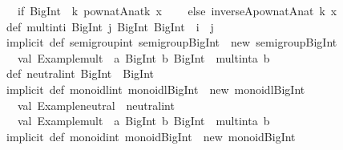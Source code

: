 \begin{isabellebody}
\begin{isamarkuptext}
\begin{typewriter}
\ \ {\isacharparenleft}if\ {\isacharparenleft}BigInt{\isacharparenleft}{}{\isacharparenright}\ {\isacharless}{\isacharequal}\ k{\isacharparenright}\ pow{\isacharunderscore}nat{\isacharbrackleft}A{\isacharbrackright}{\isacharparenleft}nat{\isacharparenleft}k{\isacharparenright}{\isacharcomma}\ x{\isacharparenright}\isanewline
\ \ \ \ else\ inverse{\isacharbrackleft}A{\isacharbrackright}{\isacharparenleft}pow{\isacharunderscore}nat{\isacharbrackleft}A{\isacharbrackright}{\isacharparenleft}nat{\isacharparenleft}{\isacharparenleft}{\isacharminus}\ k{\isacharparenright}{\isacharparenright}{\isacharcomma}\ x{\isacharparenright}{\isacharparenright}{\isacharparenright}\isanewline
\isanewline
def\ mult{\isacharunderscore}int{\isacharparenleft}i{\isacharcolon}\ BigInt{\isacharcomma}\ j{\isacharcolon}\ BigInt{\isacharparenright}{\isacharcolon}\ BigInt\ {\isacharequal}\ i\ {\isacharplus}\ j\isanewline
\isanewline
implicit\ def\ semigroup{\isacharunderscore}int{\isacharcolon}\ semigroup{\isacharbrackleft}BigInt{\isacharbrackright}\ {\isacharequal}\ new\ semigroup{\isacharbrackleft}BigInt{\isacharbrackright}\ {\isacharbraceleft}\isanewline
\ \ val\ {\isacharbackquote}Example{\isachardot}mult{\isacharbackquote}\ {\isacharequal}\ {\isacharparenleft}a{\isacharcolon}\ BigInt{\isacharcomma}\ b{\isacharcolon}\ BigInt{\isacharparenright}\ {\isacharequal}{\isachargreater}\ mult{\isacharunderscore}int{\isacharparenleft}a{\isacharcomma}\ b{\isacharparenright}\isanewline
{\isacharbraceright}\isanewline
\isanewline
def\ neutral{\isacharunderscore}int{\isacharcolon}\ BigInt\ {\isacharequal}\ BigInt{\isacharparenleft}{}{\isacharparenright}\isanewline
\isanewline
implicit\ def\ monoidl{\isacharunderscore}int{\isacharcolon}\ monoidl{\isacharbrackleft}BigInt{\isacharbrackright}\ {\isacharequal}\ new\ monoidl{\isacharbrackleft}BigInt{\isacharbrackright}\ {\isacharbraceleft}\isanewline
\ \ val\ {\isacharbackquote}Example{\isachardot}neutral{\isacharbackquote}\ {\isacharequal}\ neutral{\isacharunderscore}int\isanewline
\ \ val\ {\isacharbackquote}Example{\isachardot}mult{\isacharbackquote}\ {\isacharequal}\ {\isacharparenleft}a{\isacharcolon}\ BigInt{\isacharcomma}\ b{\isacharcolon}\ BigInt{\isacharparenright}\ {\isacharequal}{\isachargreater}\ mult{\isacharunderscore}int{\isacharparenleft}a{\isacharcomma}\ b{\isacharparenright}\isanewline
{\isacharbraceright}\isanewline
\isanewline
implicit\ def\ monoid{\isacharunderscore}int{\isacharcolon}\ monoid{\isacharbrackleft}BigInt{\isacharbrackright}\ {\isacharequal}\ new\ monoid{\isacharbrackleft}BigInt{\isacharbrackright}\ {\isacharbraceleft}\isanewline

\end{typewriter}
\end{isamarkuptext}
\end{isabellebody}
